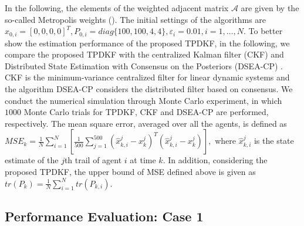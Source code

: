 \documentclass[journal,transmag]{IEEEtran}
\begin{document}
{%
	In the following, the elements of the weighted adjacent matrix $\mathcal{A}$ are given by the so-called Metropolis weights (\cite{Battistelli2014Kullback}). The initial settings of the algorithms are
	$\hat x_{0,i}=[0,0,0,0]^T,P_{0,i}=diag\{100,100,4,4\}, \varepsilon_i=0.01,i=1,\ldots,N.$
	To better show the estimation performance of the proposed TPDKF, in the following, we compare the proposed TPDKF with the centralized  Kalman filter (CKF) and Distributed State Estimation with Consensus on the Posteriors (DSEA-CP) \cite{Battistelli2014Kullback}.
	CKF is the  minimum-variance centralized filter for linear dynamic systems and
	the algorithm DSEA-CP considers the distributed filter based on consensus. 
	We conduct the numerical simulation through Monte Carlo experiment, in which $1000$ Monte Carlo trials for TPDKF, CKF and DSEA-CP are performed, respectively. The mean square error, averaged over all the agents, is defined as
$	MSE_{k}=\frac{1}{N}\sum_{i=1}^{N}\left[ \frac{1}{500}\sum_{j=1}^{500}(\hat x_{k,i}^j-x_{k}^j)^T(\hat x_{k,i}^j-x_{k}^j)\right],$
	{where $\hat x_{k,i}^j$ is the state estimate of the $j$th trail of agent $i$ at time $k$.}
	In addition, considering the proposed TPDKF, the upper bound of MSE defined above is given as $tr(P_{k})=\frac{1}{N} \sum_{i=1}^N tr(P_{k,i})$.
	
	\subsection{Performance Evaluation: Case 1}
	
}
\end{document}
